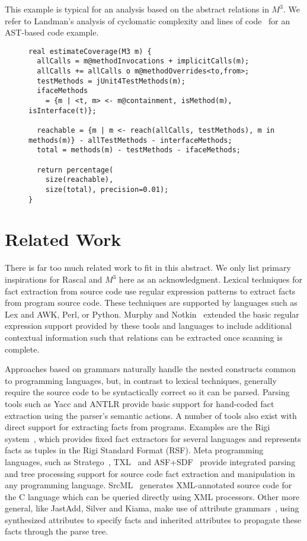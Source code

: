 \documentclass[conference]{IEEEtran}
\newcommand{\mthree}{\ensuremath{M^3}\xspace}
\begin{document}
This example is typical for an analysis based on the abstract relations in \mthree. We refer to Landman's analysis of cyclomatic complexity and lines of code~\cite{landman} for an AST-based code example.

\begin{figure}[t]
\begin{lstlisting}[caption=Statically estimating test coverage using \mthree., label=code:coverage,language=rascal]
real estimateCoverage(M3 m) {
  allCalls = m@methodInvocations + implicitCalls(m);
  allCalls += allCalls o m@methodOverrides<to,from>;
  testMethods = jUnit4TestMethods(m);
  ifaceMethods 
    = {m | <t, m> <- m@containment, isMethod(m), isInterface(t)};
  
  reachable = {m | m <- reach(allCalls, testMethods), m in methods(m)} - allTestMethods - interfaceMethods;
  total = methods(m) - testMethods - ifaceMethods;
  
  return percentage(
    size(reachable), 
    size(total), precision=0.01);
}
\end{lstlisting}
\end{figure}

\section{Related Work}

There is far too much related work to fit in this abstract. We only list primary inspirations for Rascal and \mthree here as an acknowledgment.
%
Lexical techniques for fact extraction from source code use regular expression patterns to extract facts from
program source code. These techniques are supported by languages such as Lex and AWK, Perl, or Python. Murphy and
Notkin~\cite{MurphyNotkin95,DBLP:journals/tosem/MurphyN96} extended the
basic regular expression support provided by these tools and languages
to include additional contextual information such that relations can be extracted once scanning is complete.

Approaches based on grammars naturally handle the nested constructs common to
programming languages, but, in contrast to lexical techniques, generally
require the source code to be syntactically correct so it can be parsed.
Parsing tools such as Yacc and ANTLR provide basic support for hand-coded
fact extraction using the parser's semantic actions. A number of tools also
exist with direct support for extracting facts from programs. Examples are
the Rigi system~\cite{Mueller88}, which provides fixed fact extractors for
several languages and represents facts as tuples in the Rigi Standard Format
(RSF). Meta programming languages, such as Stratego~\cite{BKVV06}, TXL~\cite{TXL06} and ASF+SDF~\cite{BDHJJKKMOSVVV01} provide integrated parsing and tree processing support for source code fact extraction and manipulation in any programming language. SrcML~\cite{srcml} generates XML-annotated source code for the C language which can be queried directly using XML processors. Other more general, like JastAdd, Silver and Kiama, make use of attribute
grammars~\cite{FNC2,Paakki95,EkmanHedin07,kiama,DBLP:journals/scp/WykBGK10},
using synthesized attributes to specify facts and inherited attributes to
propagate these facts through the parse tree.
\end{document}
